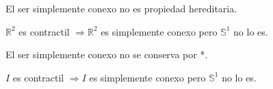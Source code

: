 \begin{obs}
  El ser simplemente conexo no es propiedad hereditaria.
\end{obs}

\begin{ejm}
  $\mathbb{R}^{2}$ es contractil $\Rightarrow \mathbb{R}^{2}$ es simplemente conexo pero $\mathbb{S}^{1}$ no lo es.
\end{ejm}

\begin{obs}
  El ser simplemente conexo no se conserva por *.
\end{obs}

\begin{ejm}
  $I$ es contractil $\Rightarrow I$ es simplemente conexo pero $\mathbb{S}^{1}$ no lo es.
\end{ejm}
